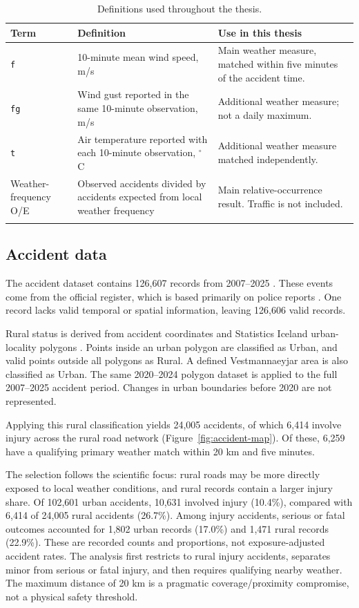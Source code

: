 \begin{table}[H]
\centering
\small
\caption{Definitions used throughout the thesis.}
\label{tab:definitions}
\begin{tabularx}{\textwidth}{L{0.12\textwidth}L{0.34\textwidth}X}
\toprule
Term & Definition & Use in this thesis \\
\midrule
\texttt{f} & 10-minute mean wind speed, m/s & Main weather measure, matched within five minutes of the accident time. \\ \grayhline
\texttt{fg} & Wind gust reported in the same 10-minute observation, m/s & Additional weather measure; not a daily maximum. \\ \grayhline
\texttt{t} & Air temperature reported with each 10-minute observation, \(^{\circ}\)C & Additional weather measure matched independently. \\ \grayhline
Weather-frequency O/E & Observed accidents divided by accidents expected from local weather frequency & Main relative-occurrence result. Traffic is not included. \\ \grayhline
\bottomrule
\end{tabularx}
\end{table}

\subsection{Accident data}

The accident dataset contains 126,607 records from 2007--2025
\citep{samgongustofaAccidents}. These events come from the official register, which is based primarily on police reports \citep{samgongustofaRegister}. One record lacks valid temporal or spatial
information, leaving 126,606 valid records.

Rural status is derived from accident coordinates and Statistics Iceland
urban-locality polygons \citep{hagstofaThettbyli}. Points inside an urban polygon
are classified as Urban, and valid points outside all polygons as Rural. A
defined Vestmannaeyjar area is also classified as Urban. The same 2020--2024
polygon dataset is applied to the full 2007--2025 accident period. Changes in
urban boundaries before 2020 are not represented.

Applying this rural classification yields 24,005 accidents, of which 6,414
involve injury across the rural road network (Figure~\ref{fig:accident-map}). Of these, 6,259 have a qualifying primary weather match
within 20 km and five minutes.

The selection follows the scientific focus: rural roads may be more directly exposed to local weather conditions, and rural records contain a larger injury share. Of 102,601 urban accidents, 10,631 involved injury (10.4\%), compared with 6,414 of 24,005 rural accidents (26.7\%). Among injury accidents, serious or fatal outcomes accounted for 1,802 urban records (17.0\%) and 1,471 rural records (22.9\%). These are recorded counts and proportions, not exposure-adjusted accident rates. The analysis first restricts to rural injury accidents, separates minor from serious or fatal injury, and then requires qualifying nearby weather. The maximum distance of 20 km is a pragmatic coverage/proximity compromise, not a physical safety threshold.

